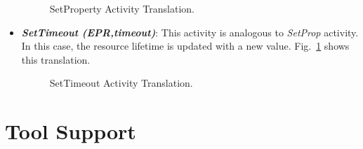 \begin{itemize}
\begin{figure}[!ht]
\begin{center}
\end{center}
\caption{\label{setp} SetProperty Activity Translation.}
\end{figure}

\item {\bf {\it SetTimeout (EPR,timeout)}}:
This activity is analogous to {\em SetProp} activity. In this case, the resource lifetime is updated with a new value. Fig.~\ref{setp} shows this translation. 

\begin{figure}[!ht]
\begin{center}
\end{center}
\caption{\label{settim} SetTimeout Activity Translation.}
\end{figure}
\end{itemize}

\section{Tool Support}

